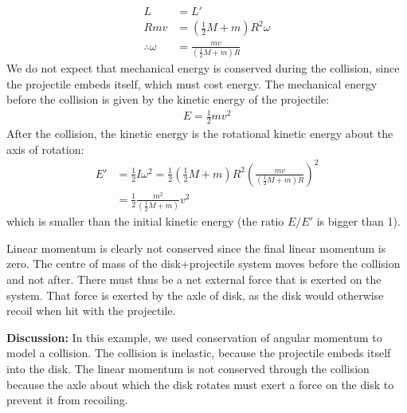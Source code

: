 \begin{example}
\begin{align*}
L &= L'\\
Rmv &= \left(\frac{1}{2}M+m\right)R^2\omega\\
\therefore \omega &= \frac{mv}{\left(\frac{1}{2}M+m\right)R}
\end{align*}
We do not expect that mechanical energy is conserved during the collision, since the projectile embeds itself, which must cost energy. The mechanical energy before the collision is given by the kinetic energy of the projectile:
\begin{align*}
E = \frac{1}{2}mv^2
\end{align*}
After the collision, the kinetic energy is the rotational kinetic energy about the axis of rotation:
\begin{align*}
E' &= \frac{1}{2}I\omega^2 = \frac{1}{2} \left(\frac{1}{2}M+m\right)R^2 \left( \frac{mv}{\left(\frac{1}{2}M+m\right)R}\right)^2\\
&= \frac{1}{2} \frac{m^2}{\left(\frac{1}{2}M+m\right)} v^2
\end{align*}
which is smaller than the initial kinetic energy (the ratio $E/E'$ is bigger than 1). 

Linear momentum is clearly not conserved since the final linear momentum is zero. The centre of mass of the disk+projectile system moves before the collision and not after. There must thus be a net external force that is exerted on the system. That force is exerted by the axle of disk, as the disk would otherwise recoil when hit with the projectile.

\textbf{Discussion:} In this example, we used conservation of angular momentum to model a collision. The collision is inelastic, because the projectile embeds itself into the disk. The linear momentum is not conserved through the collision because the axle about which the disk rotates must exert a force on the disk to prevent it from recoiling. 
\end{example}

